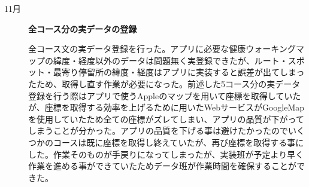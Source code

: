 ﻿\begin{description}
 \item[11月] \textbf{全コース分の実データの登録}\par
 全コース文の実データ登録を行った。アプリに必要な健康ウォーキングマップの緯度・経度以外のデータは問題無く実登録できたが、ルート・スポット・最寄り停留所の緯度・経度はアプリに実装すると誤差が出てしまったため、取得し直す作業が必要になった。前述した5コース分の実データ登録を行う際はアプリで使うAppleのマップを用いて座標を取得していたが、座標を取得する効率を上げるために用いたWebサービスがGoogleMapを使用していたため全ての座標がズレてしまい、アプリの品質が下がってしまうことが分かった。アプリの品質を下げる事は避けたかったのでいくつかのコースは既に座標を取得し終えていたが、再び座標を取得する事にした。作業そのものが手戻りになってしまったが、実装班が予定より早く作業を進める事ができていたためデータ班が作業時間を確保することができた。
  \par

\end{description}
